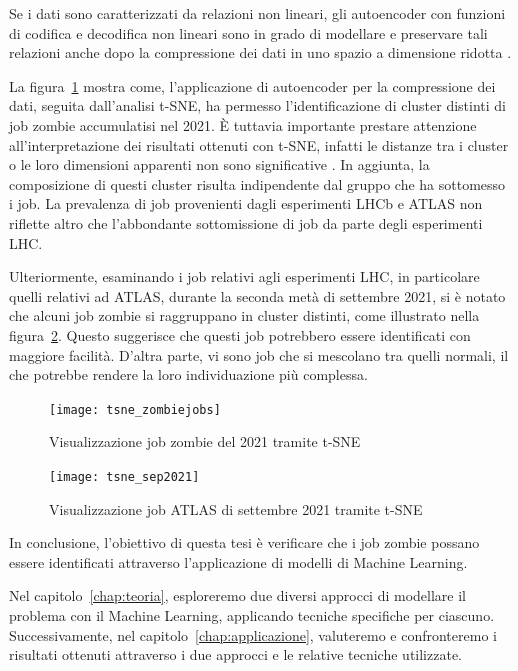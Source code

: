 Se i dati sono caratterizzati da relazioni non lineari, gli autoencoder con
funzioni di codifica e decodifica non lineari sono in grado di modellare e
preservare tali relazioni anche dopo la compressione dei dati in uno spazio a
dimensione ridotta \cite{Goodfellow2016}.

La figura~\ref{fig:tsne_zombiejobs} mostra come, l'applicazione di autoencoder
per la compressione dei dati, seguita dall'analisi t-SNE, ha permesso
l'identificazione di cluster distinti di job zombie accumulatisi nel 2021. È
tuttavia importante prestare attenzione all'interpretazione dei risultati
ottenuti con t-SNE, infatti le distanze tra i cluster o le loro dimensioni
apparenti non sono significative \cite{Wattenberg2016}. In aggiunta, la
composizione di questi cluster risulta indipendente dal gruppo che ha
sottomesso i job. La prevalenza di job provenienti dagli esperimenti LHCb e
ATLAS non riflette altro che l'abbondante sottomissione di job da parte degli
esperimenti LHC.

Ulteriormente, esaminando i job relativi agli esperimenti LHC, in particolare
quelli relativi ad ATLAS, durante la seconda metà di settembre 2021, si è
notato che alcuni job zombie si raggruppano in cluster distinti, come
illustrato nella figura~\ref{fig:tsne_sep2021}. Questo suggerisce che questi
job potrebbero essere identificati con maggiore facilità. D'altra parte, vi
sono job che si mescolano tra quelli normali, il che potrebbe rendere la loro
individuazione più complessa.

\begin{figure}[!hb]
   \centering
   \texttt{[image: tsne\_zombiejobs]}
   \caption{Visualizzazione job zombie del 2021 tramite t-SNE}
   \label{fig:tsne_zombiejobs}
\end{figure}

\begin{figure}[!hb]
   \centering
   \texttt{[image: tsne\_sep2021]}
   \caption{Visualizzazione job ATLAS di settembre 2021 tramite t-SNE}
   \label{fig:tsne_sep2021}
\end{figure}

In conclusione, l'obiettivo di questa tesi è verificare che i job zombie
possano essere identificati attraverso l'applicazione di modelli di Machine
Learning.

Nel capitolo~\ref{chap:teoria}, esploreremo due diversi approcci di modellare
il problema con il Machine Learning, applicando tecniche specifiche per
ciascuno. Successivamente, nel capitolo~\ref{chap:applicazione}, valuteremo e
confronteremo i risultati ottenuti attraverso i due approcci e le relative
tecniche utilizzate.
